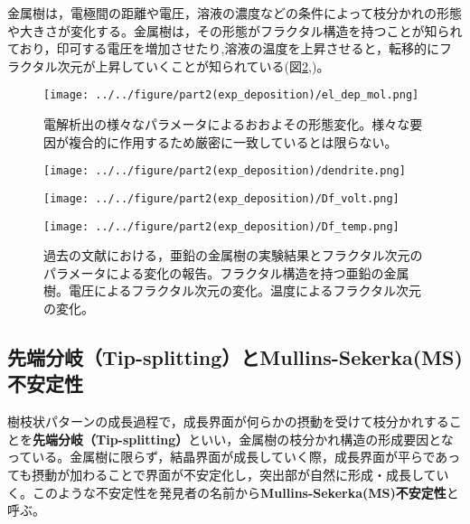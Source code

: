 \documentclass[autodetect-engine,dvi=dvipdfmx,a4paper,ja=standard,oneside,openany,11pt,draft]{bxjsbook}
\begin{document}
金属樹は，電極間の距離や電圧，溶液の濃度などの条件によって枝分かれの形態や大きさが変化する。金属樹は，その形態がフラクタル構造を持つことが知られており\cite{matsushita1984fractal}，印可する電圧を増加させたり\cite{matsushita1984fractal},溶液の温度を上昇させると\cite{suda2003temperature}，転移的にフラクタル次元が上昇していくことが知られている(図\ref{fig:fractal_dimension},)。
\begin{figure}[htbp]
  \centering
  \texttt{[image: ../../figure/part2(exp\_deposition)/el\_dep\_mol.png]}
  \caption{電解析出の様々なパラメータによるおおよその形態変化。様々な要因が複合的に作用するため厳密に一致しているとは限らない\cite{suda2003temperature}。}
  \label{fig:el_dep_mol}
\end{figure}

\begin{figure}[htbp]
  \begin{minipage}{0.28\textwidth}
    \subcaption{}
    \centering
    \texttt{[image: ../../figure/part2(exp\_deposition)/dendrite.png]}
    \label{fig:el_dep_fractal}
  \end{minipage}
  \begin{minipage}
    {0.35\textwidth}
    \subcaption{}
    \centering
    \texttt{[image: ../../figure/part2(exp\_deposition)/Df\_volt.png]}
    \label{fig:Df_volt}
  \end{minipage}
  \begin{minipage}
    {0.35\textwidth}
    \subcaption{}
    \centering
    \texttt{[image: ../../figure/part2(exp\_deposition)/Df\_temp.png]}
    \label{fig:Df_temp}
  \end{minipage}
  \caption{過去の文献における，亜鉛の金属樹の実験結果とフラクタル次元のパラメータによる変化の報告。フラクタル構造を持つ亜鉛の金属樹\cite{matsushita1984fractal}。電圧によるフラクタル次元の変化\cite{matsushita1984fractal}。温度によるフラクタル次元の変化\cite{suda2003temperature}。}
  \label{fig:fractal_dimension}
\end{figure}

\subsection{先端分岐（Tip-splitting）とMullins-Sekerka(MS)不安定性}
\label{sec:tip_splitting}
樹枝状パターンの成長過程で，成長界面が何らかの摂動を受けて枝分かれすることを\textbf{先端分岐（Tip-splitting）}といい，金属樹の枝分かれ構造の形成要因となっている。金属樹に限らず，結晶界面が成長していく際，成長界面が平らであっても摂動が加わることで界面が不安定化し，突出部が自然に形成・成長していく。このような不安定性を発見者の名前から\textbf{Mullins-Sekerka(MS)不安定性}と呼ぶ。
\end{document}
